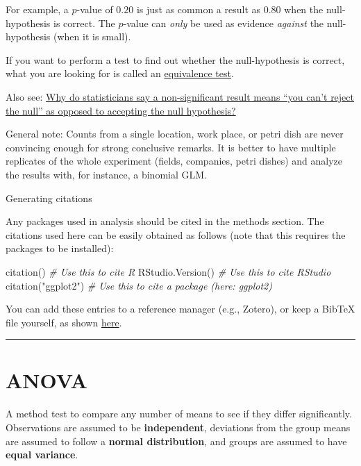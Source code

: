 \documentclass[
]{book}
\newenvironment{Shaded}{\begin{snugshade}}{\end{snugshade}}
\newcommand{\CommentTok}[1]{\textcolor[rgb]{0.56,0.35,0.01}{\textit{#1}}}
\newcommand{\FunctionTok}[1]{\textcolor[rgb]{0.00,0.00,0.00}{#1}}
\newcommand{\NormalTok}[1]{#1}
\newcommand{\StringTok}[1]{\textcolor[rgb]{0.31,0.60,0.02}{#1}}
\begin{document}
For example, a \(p\)-value of \(0.20\) is just as common a result as \(0.80\) when the null-hypothesis is correct. The \(p\)-value can \emph{only} be used as evidence \emph{against} the null-hypothesis (when it is small).

If you want to perform a test to find out whether the null-hypothesis is correct, what you are looking for is called an \href{https://en.wikipedia.org/wiki/Equivalence_test}{equivalence test}.

Also see: \href{https://stats.stackexchange.com/a/85914/176202}{Why do statisticians say a non-significant result means ``you can't reject the null'' as opposed to accepting the null hypothesis?}

General note: Counts from a single location, work place, or petri dish are never convincing enough for strong conclusive remarks. It is better to have multiple replicates of the whole experiment (fields, companies, petri dishes) and analyze the results with, for instance, a binomial GLM.

Generating citations

Any packages used in analysis should be cited in the methods section. The citations used here can be easily obtained as follows (note that this requires the packages to be installed):

\begin{Shaded}
\begin{Highlighting}[]
\FunctionTok{citation}\NormalTok{()          }\CommentTok{\# Use this to cite R}
\FunctionTok{RStudio.Version}\NormalTok{()   }\CommentTok{\# Use this to cite RStudio}
\FunctionTok{citation}\NormalTok{(}\StringTok{"ggplot2"}\NormalTok{) }\CommentTok{\# Use this to cite a package (here: ggplot2)}
\end{Highlighting}
\end{Shaded}

You can add these entries to a reference manager (e.g., Zotero), or keep a BibTeX file yourself, as shown \href{https://youtu.be/zuuOYjE8m98}{here}.

\begin{center}\rule{0.5\linewidth}{0.5pt}\end{center}

\hypertarget{anova}{%
\chapter{ANOVA}\label{anova}}

A method test to compare any number of means to see if they differ significantly. Observations are assumed to be \textbf{independent}, deviations from the group means are assumed to follow a \textbf{normal distribution}, and groups are assumed to have \textbf{equal variance}.
\end{document}
